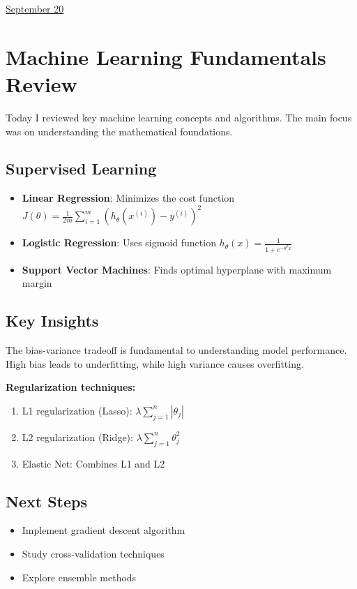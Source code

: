 \documentclass[11pt,letterpaper]{article}
\begin{document}
\href{run:2025-09-20-machine-learning.tex}{\Huge September 20} %

\section{Machine Learning Fundamentals Review}

Today I reviewed key machine learning concepts and algorithms. The main focus was on understanding the mathematical foundations.

\subsection{Supervised Learning}
\begin{itemize}
    \item \textbf{Linear Regression}: Minimizes the cost function $J(\theta) = \frac{1}{2m} \sum_{i=1}^{m} (h_\theta(x^{(i)}) - y^{(i)})^2$
    \item \textbf{Logistic Regression}: Uses sigmoid function $h_\theta(x) = \frac{1}{1 + e^{-\theta^T x}}$
    \item \textbf{Support Vector Machines}: Finds optimal hyperplane with maximum margin
\end{itemize}

\subsection{Key Insights}
The bias-variance tradeoff is fundamental to understanding model performance. High bias leads to underfitting, while high variance causes overfitting.

\textbf{Regularization techniques:}
\begin{enumerate}
    \item L1 regularization (Lasso): $\lambda \sum_{j=1}^{n} |\theta_j|$
    \item L2 regularization (Ridge): $\lambda \sum_{j=1}^{n} \theta_j^2$
    \item Elastic Net: Combines L1 and L2
\end{enumerate}

\subsection{Next Steps}
\begin{itemize}
    \item Implement gradient descent algorithm
    \item Study cross-validation techniques
    \item Explore ensemble methods
\end{itemize}

 
\end{document}
